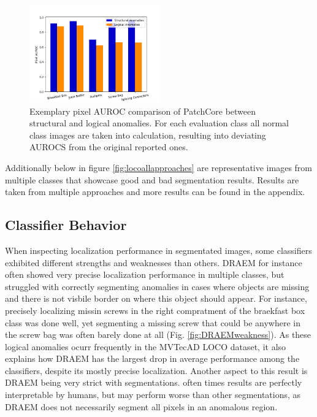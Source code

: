 \begin{figure}[H]
    \centering
    \includegraphics[width=0.5\textwidth]{figures/structvslogic.png}
    \caption{Exemplary pixel AUROC comparison of PatchCore \cite{patchCore2022} between structural and logical anomalies. For each evaluation class all normal class images 
             are taken into calculation, resulting into deviating AUROCS from the original reported ones.}
    \label{fig:structvslogic}
\end{figure}

Additionally below in figure \ref{fig:locoallapproaches} are representative images from multiple classes that showcase good and bad segmentation results. Results are taken from multiple approaches and 
more results can be found in the appendix.

%
%




\subsection{Classifier Behavior}
\label{subsec:classifierbehavior}

When inspecting localization performance in segmentated images, some classifiers exhibited different strengths and weaknesses than others. 
DRAEM \cite{Zavrtanik_2021DRAEM} for instance often showed very precise localization performance in multiple classes, but struggled 
with correctly segmenting anomalies in cases where objects are missing and there is not visbile border on where this object should 
appear. For instance, precisely localizing missin screws in the right compratment of the braekfast box class was done well, yet 
segmenting a missing screw that could be anywhere in the screw bag was often barely done at all (Fig. \ref{fig:DRAEMweakness}). As these logical anomalies ocurr 
frequently in the MVTecAD LOCO \cite{LOCODentsAndScratchesBergmann2022} dataset, it also explains how DRAEM 
has the largest drop in average performance among the classifiers, despite its mostly precise localization. Another aspect to this result is DRAEM being very strict with 
segmentations. often times results are perfectly interpretable by humans, but may perform worse than other segmentations, as DRAEM does not necessarily segment all pixels in 
an anomalous region.

